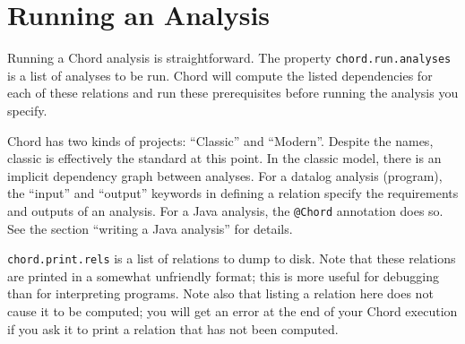 \section{Running an Analysis}
\label{sec:running-analysis}

Running a Chord analysis is straightforward.
The property  \texttt{chord.run.analyses} is a list of analyses to be run. Chord will compute the listed dependencies for each of these relations and run these prerequisites before running the analysis you specify.

Chord has two kinds of projects: ``Classic'' and ``Modern''.  Despite the names, classic is effectively the standard at this point.
In the classic model, there is an implicit dependency graph between analyses. For a datalog analysis (program), the ``input'' and ``output'' keywords in defining a relation specify the requirements and outputs of an analysis.  For a Java analysis, the \texttt{@Chord} annotation does so. See the section ``writing a Java analysis'' for details.

\texttt{chord.print.rels} is a list of relations to dump to disk. Note that these relations are printed in a somewhat unfriendly format; this is more useful for debugging than for interpreting programs. Note also that listing a relation here does not cause it to be computed; you will get an error at the end of your Chord execution if you ask it to print a relation that has not been computed.


